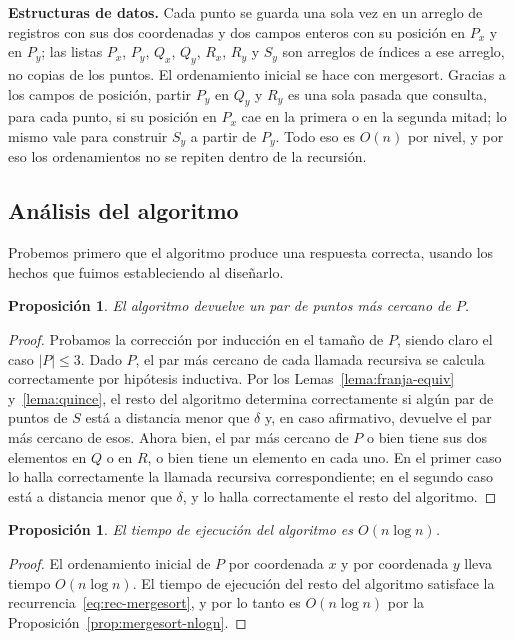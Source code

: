 \documentclass[12pt, spanish, oneside, openany]{book}
\newenvironment{estructuras}%
  {\begin{center}\begin{minipage}{0.93\textwidth}\begin{mdframed}[style=estrbox]%
   \small\textbf{Estructuras de datos.}\;}%
  {\end{mdframed}\end{minipage}\end{center}}
\theoremstyle{uprightplain}
\newtheorem{proposicion}[teorema]{Proposición}
\theoremstyle{definition}
\theoremstyle{remark}
\theoremstyle{definition}
\begin{document}
\begin{estructuras}
Cada punto se guarda una sola vez en un arreglo de registros con sus dos
coordenadas y dos campos enteros con su posición en $P_x$ y en $P_y$; las listas
$P_x$, $P_y$, $Q_x$, $Q_y$, $R_x$, $R_y$ y $S_y$ son arreglos de índices a ese
arreglo, no copias de los puntos. El ordenamiento inicial se hace con mergesort.
Gracias a los campos de posición, partir $P_y$ en $Q_y$ y $R_y$ es una sola
pasada que consulta, para cada punto, si su posición en $P_x$ cae en la primera o
en la segunda mitad; lo mismo vale para construir $S_y$ a partir de $P_y$. Todo
eso es $O(n)$ por nivel, y por eso los ordenamientos no se repiten dentro de la
recursión.
\end{estructuras}

\subsection{Análisis del algoritmo}

Probemos primero que el algoritmo produce una respuesta correcta, usando los hechos que fuimos estableciendo al diseñarlo.

\begin{proposicion}
\label{prop:par-cercano-correcto}
El algoritmo devuelve un par de puntos más cercano de $P$.
\end{proposicion}
\begin{proof}
Probamos la corrección por inducción en el tamaño de $P$, siendo claro el caso $|P|\le 3$. Dado $P$, el par más cercano de cada llamada recursiva se calcula correctamente por hipótesis inductiva. Por los Lemas~\ref{lema:franja-equiv} y~\ref{lema:quince}, el resto del algoritmo determina correctamente si algún par de puntos de $S$ está a distancia menor que $\delta$ y, en caso afirmativo, devuelve el par más cercano de esos. Ahora bien, el par más cercano de $P$ o bien tiene sus dos elementos en $Q$ o en $R$, o bien tiene un elemento en cada uno. En el primer caso lo halla correctamente la llamada recursiva correspondiente; en el segundo caso está a distancia menor que $\delta$, y lo halla correctamente el resto del algoritmo.
\end{proof}

\begin{proposicion}
\label{prop:par-cercano-tiempo}
El tiempo de ejecución del algoritmo es $O(n\log n)$.
\end{proposicion}
\begin{proof}
El ordenamiento inicial de $P$ por coordenada $x$ y por coordenada $y$ lleva tiempo $O(n\log n)$. El tiempo de ejecución del resto del algoritmo satisface la recurrencia~\eqref{eq:rec-mergesort}, y por lo tanto es $O(n\log n)$ por la Proposición~\ref{prop:mergesort-nlogn}.
\end{proof}
\end{document}
